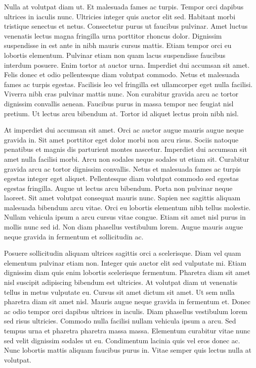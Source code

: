 \documentclass[11pt,a4paper]{article}
\begin{document}
Nulla at volutpat diam ut. Et malesuada fames ac turpis. Tempor orci dapibus ultrices in iaculis nunc. Ultricies integer quis auctor elit sed. Habitant morbi tristique senectus et netus. Consectetur purus ut faucibus pulvinar. Amet luctus venenatis lectus magna fringilla urna porttitor rhoncus dolor. Dignissim suspendisse in est ante in nibh mauris cursus mattis. Etiam tempor orci eu lobortis elementum. Pulvinar etiam non quam lacus suspendisse faucibus interdum posuere. Enim tortor at auctor urna. Imperdiet dui accumsan sit amet. Felis donec et odio pellentesque diam volutpat commodo. Netus et malesuada fames ac turpis egestas. Facilisis leo vel fringilla est ullamcorper eget nulla facilisi. Viverra nibh cras pulvinar mattis nunc. Non curabitur gravida arcu ac tortor dignissim convallis aenean. Faucibus purus in massa tempor nec feugiat nisl pretium. Ut lectus arcu bibendum at. Tortor id aliquet lectus proin nibh nisl.

At imperdiet dui accumsan sit amet. Orci ac auctor augue mauris augue neque gravida in. Sit amet porttitor eget dolor morbi non arcu risus. Sociis natoque penatibus et magnis dis parturient montes nascetur. Imperdiet dui accumsan sit amet nulla facilisi morbi. Arcu non sodales neque sodales ut etiam sit. Curabitur gravida arcu ac tortor dignissim convallis. Netus et malesuada fames ac turpis egestas integer eget aliquet. Pellentesque diam volutpat commodo sed egestas egestas fringilla. Augue ut lectus arcu bibendum. Porta non pulvinar neque laoreet. Sit amet volutpat consequat mauris nunc. Sapien nec sagittis aliquam malesuada bibendum arcu vitae. Orci eu lobortis elementum nibh tellus molestie. Nullam vehicula ipsum a arcu cursus vitae congue. Etiam sit amet nisl purus in mollis nunc sed id. Non diam phasellus vestibulum lorem. Augue mauris augue neque gravida in fermentum et sollicitudin ac.

Posuere sollicitudin aliquam ultrices sagittis orci a scelerisque. Diam vel quam elementum pulvinar etiam non. Integer quis auctor elit sed vulputate mi. Etiam dignissim diam quis enim lobortis scelerisque fermentum. Pharetra diam sit amet nisl suscipit adipiscing bibendum est ultricies. At volutpat diam ut venenatis tellus in metus vulputate eu. Cursus sit amet dictum sit amet. Ut sem nulla pharetra diam sit amet nisl. Mauris augue neque gravida in fermentum et. Donec ac odio tempor orci dapibus ultrices in iaculis. Diam phasellus vestibulum lorem sed risus ultricies. Commodo nulla facilisi nullam vehicula ipsum a arcu. Sed tempus urna et pharetra pharetra massa massa. Elementum curabitur vitae nunc sed velit dignissim sodales ut eu. Condimentum lacinia quis vel eros donec ac. Nunc lobortis mattis aliquam faucibus purus in. Vitae semper quis lectus nulla at volutpat.
\end{document}
